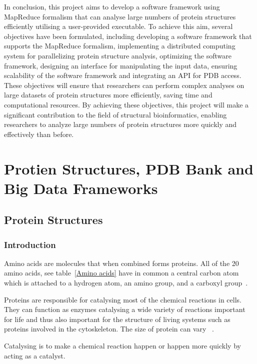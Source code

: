 \documentclass[]{final_report}
\begin{document}
In conclusion, this project aims to develop a software framework using MapReduce formalism that can analyse large numbers of protein structures efficiently utilising a user-provided executable. To achieve this aim, several objectives have been formulated, including developing a software framework that supports the MapReduce formalism, implementing a distributed computing system for parallelizing protein structure analysis, optimizing the software framework, designing an interface for manipulating the input data, ensuring scalability of the software framework and integrating an API for PDB access. These objectives will ensure that researchers can perform complex analyses on large datasets of protein structures more efficiently, saving time and computational resources. By achieving these objectives, this project will make a significant contribution to the field of structural bioinformatics, enabling researchers to analyze large numbers of protein structures more quickly and effectively than before.

\section{Protien Structures, PDB Bank and Big Data Frameworks}
\subsection{Protein Structures}
\subsubsection{Introduction}

Amino acids are molecules that when combined forms proteins. All of the 20 amino acids, see table~\ref{Amino acids} have in common a central carbon atom which is attached to a hydrogen atom, an amino group, and a carboxyl group~\cite{branden_introduction_1998}.

Proteins are responsible for catalysing most of the chemical reactions in cells. They can function as enzymes catalysing a wide variety of reactions important for life and thus also important for the structure of living systems such as proteins involved in the cytoskeleton. The size of protein can vary ~\cite{zvelebil_understanding_2008}.

\begin{definition}[Catalysing]
    Catalysing is to make a chemical reaction happen or happen more quickly by acting as a catalyst.
\end{definition}
\end{document}
